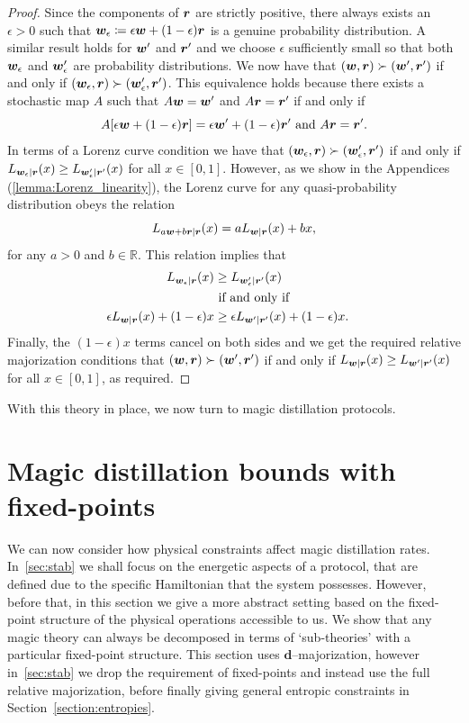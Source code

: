 \documentclass[pra,
aps,
twocolumn,
superscriptaddress,
groupedaddress,
nofootinbib,
reprint
]{revtex4-1}
\begin{document}
 \begin{proof}
Since the components of $\boldsymbol{r}$ are strictly positive, there always exists an $\epsilon >0$ such that $\boldsymbol{w}_\epsilon \coloneqq \epsilon \boldsymbol{w} + (1-\epsilon) \boldsymbol{r}$ is a genuine probability distribution. A similar result holds for $\boldsymbol{w}'$ and $\boldsymbol{r}'$ and we choose $\epsilon$ sufficiently small so that both $\boldsymbol{w}_\epsilon$ and $\boldsymbol{w}_\epsilon'$ are probability distributions. We now have that $(\boldsymbol{w} , \boldsymbol{r}) \succ (\boldsymbol{w}', \boldsymbol{r}')$ if and only if $(\boldsymbol{w}_\epsilon , \boldsymbol{r}) \succ (\boldsymbol{w}_\epsilon', \boldsymbol{r}')$. This equivalence holds because there exists a stochastic map $A$ such that $A \boldsymbol{w} = \boldsymbol{w}'$ and $A \boldsymbol{r} = \boldsymbol{r}'$ if and only if 
\begin{equation}
A[\epsilon \boldsymbol{w} + (1-\epsilon) \boldsymbol{r}] = \epsilon \boldsymbol{w}' + (1-\epsilon) \boldsymbol{r}'\mbox{ and } A\boldsymbol{r} = \boldsymbol{r}'.
\end{equation}
In terms of a Lorenz curve condition we have that $(\boldsymbol{w}_\epsilon , \boldsymbol{r}) \succ (\boldsymbol{w}_\epsilon', \boldsymbol{r}')$ if and only if $L_{\boldsymbol{w}_\epsilon |\boldsymbol{r}} (x) \ge L_{\boldsymbol{w}'_\epsilon |\boldsymbol{r}'} (x)$ for all $x \in [0,1]$. 
However, as we show in the Appendices (\cref{lemma:Lorenz_linearity}), the Lorenz curve for any quasi-probability distribution obeys the relation
\begin{equation}
L_{a \boldsymbol{w} + b \boldsymbol{r} | \boldsymbol{r}} (x) = a L_{\boldsymbol{w}|\boldsymbol{r}} (x) + bx,
\end{equation}
for any $a >0$ and $b \in \mathbb{R}$. This relation implies that
\begin{align}
L_{\boldsymbol{w}_\epsilon |\boldsymbol{r}} (x) &\ge L_{\boldsymbol{w}'_\epsilon |\boldsymbol{r}'} (x) \nonumber \\ 
&\mbox{ if and only if }& \nonumber \\
\epsilon L_{\boldsymbol{w} |\boldsymbol{r}} (x) + (1-\epsilon) x &\ge \epsilon L_{\boldsymbol{w}' |\boldsymbol{r}'} (x) + (1-\epsilon) x.
\end{align}
Finally, the $(1-\epsilon)x$ terms cancel on both sides and we get the required relative majorization conditions that $(\boldsymbol{w}, \boldsymbol{r}) \succ (\boldsymbol{w}', \boldsymbol{r}')$ if and only if $L_{\boldsymbol{w} | \boldsymbol{r}} (x) \ge L_{\boldsymbol{w}' | \boldsymbol{r}'}(x)$ for all $x \in [0,1]$, as required.
\end{proof}

With this theory in place, we now turn to magic distillation protocols.

\section{Magic distillation bounds with fixed-points}
\label{sec:frag}

We can now consider how physical constraints affect magic distillation rates. In~\cref{sec:stab} we shall focus on the energetic aspects of a protocol, that are defined due to the specific Hamiltonian that the system possesses. However, before that, in this section we give a more abstract setting based on the fixed-point structure of  the physical operations accessible to us. We show that any magic theory can always be decomposed in terms of `sub-theories' with a particular fixed-point structure. This section uses $\mathbf{d}$--majorization, however in~\cref{sec:stab} we drop the requirement of fixed-points and instead use the full relative majorization, before finally giving general entropic constraints in Section~\ref{section:entropies}.
 
\end{document}
